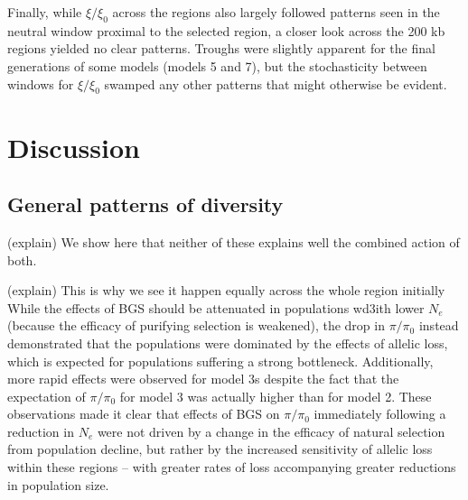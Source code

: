 \documentclass[9pt,twocolumn,twoside]{rilabRxiv}
\newcommand{\citex}[1]{{\small \textcolor{red}{CITE(#1)}}}
\begin{document}
Finally, while  $\xi/\xi_0$ across the regions also largely followed patterns seen in the neutral window proximal to the selected region, a closer look across the 200 kb regions yielded no clear patterns. 
Troughs were slightly apparent for the final generations of some models (models 5 and 7), but the stochasticity between windows for $\xi/\xi_0$ swamped any other patterns that might otherwise be evident.

\section{Discussion}

\subsection{General patterns of diversity}

(explain)
We show here that neither of these explains well the combined action of both.

(explain)
This is why we see it happen equally across the whole region initially 
While the effects of BGS should be attenuated in populations wd3ith lower $N_e$ (because the efficacy of purifying selection is weakened), the drop in $\pi/\pi_0$ instead demonstrated that the populations were dominated by the effects of allelic loss, which is expected for populations suffering a strong bottleneck.
Additionally, more rapid effects were observed for model 3s despite the fact that the expectation of $\pi/\pi_0$ for model 3 was actually higher than for model 2.
These observations made it clear that effects of BGS on $\pi/\pi_0$ immediately following a reduction in $N_e$ were not driven by a change in the efficacy of natural selection from population decline, but rather by the increased sensitivity of allelic loss within these regions -- with greater rates of loss accompanying greater reductions in population size.
\end{document}
